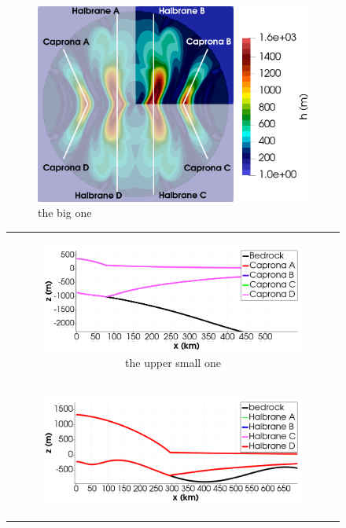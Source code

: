 \documentclass{article}
\begin{document}
\begin{figure}
  \begin{subfigure}[c]{.52\linewidth}
    \centering
    \includegraphics[width=\linewidth]{../fig/Profiles_Thule_combined_domains_2_con_fondo.png}%
    \caption
      {%
        the big one%
        \label{fig:big}%
      }%
  \end{subfigure}\hfill
  \begin{tabular}[c]{@{}c@{}}
    \begin{subfigure}[c]{.48\linewidth}
      \centering
      \includegraphics[width=\linewidth]{../fig/Capronas_Thule_Domain_con_fondo.png}%
      \caption
        {%
          the upper small one%
          \label{fig:upper}%
        }%
    \end{subfigure}\\
    \noalign{\bigskip}%
    \begin{subfigure}[c]{.48\linewidth}
      \centering
      \includegraphics[width=\linewidth,page=2]{../fig/Halbranes_thule_domain_con_fondo.png}%

\end{subfigure}
\end{tabular}
\end{figure}
\end{document}
